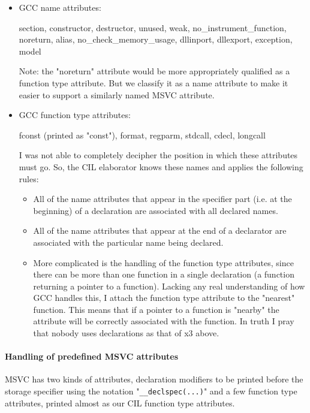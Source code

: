 \documentclass{article}
\def\t#1{{\tt #1}}
\begin{document}
\begin{itemize}
  \item GCC name attributes:
   
   section, constructor, destructor, unused, weak, no\_instrument\_function,
   noreturn, alias, no\_check\_memory\_usage, dllinport, dllexport, exception,
   model

      Note: the "noreturn" attribute would be more appropriately qualified as a
      function type attribute. But we classify it as a name attribute to make
      it easier to support a similarly named MSVC attribute. 
  
  \item GCC function type attributes:

    fconst (printed as "const"), format, regparm, stdcall,
    cdecl, longcall

  I was not able to completely decipher the position in which these attributes
  must go. So, the CIL elaborator knows these names and applies the following
  rules: 
  \begin{itemize}
  \item All of the name attributes that appear in the specifier part (i.e. at
  the beginning) of a declaration are associated with all declared names. 

  \item All of the name attributes that appear at the end of a declarator are
  associated with the particular name being declared.

  \item More complicated is the handling of the function type attributes, since
     there can be more than one function in a single declaration (a function
     returning a pointer to a function). Lacking any real understanding of how
     GCC handles this, I attach the function type attribute to the "nearest"
     function. This means that if a pointer to a function is "nearby" the
     attribute will be correctly associated with the function. In truth I pray
     that nobody uses declarations as that of x3 above. 
  \end{itemize}
\end{itemize}

\paragraph{Handling of predefined MSVC attributes}

  MSVC has two kinds of attributes, declaration modifiers to be printed before
  the storage specifier using the notation "\t{\_\_declspec(...)}" and a few
  function type attributes, printed almost as our CIL function type
  attributes. 
\end{document}
